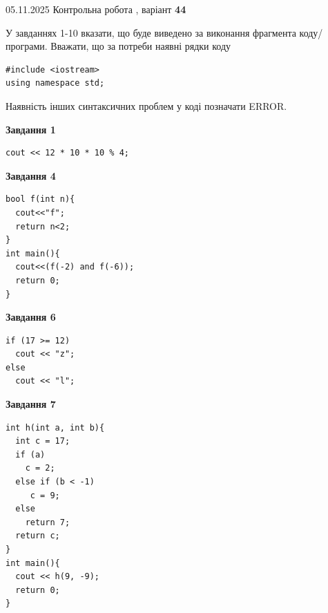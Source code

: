 \documentclass[12pt, ukrainian]{article}
\begin{document}
\newpage

{\Large{05.11.2025 Контрольна робота , варіант  \No \textbf { 44 }\par}}
{
\begin {large}
У завданнях 1-10 вказати, що буде виведено за виконання фрагмента коду/про\-гра\-ми.
Вважати, що за потреби наявні рядки коду
\begin{verbatim}
#include <iostream>
using namespace std;
\end{verbatim}
Наявність інших синтаксичних проблем у коді позначати ERROR.

\begin{minipage}[t]{7.0cm}

\begin{center}
\textbf{Завдання 1}
\end{center}
\vspace{-8mm}

\begin{verbatim}
cout << 12 * 10 * 10 % 4;
\end{verbatim}



\begin{center}
\textbf{Завдання 4}
\end{center}
\vspace{-8mm}

\begin{verbatim}
bool f(int n){
  cout<<"f";
  return n<2;
}
int main(){
  cout<<(f(-2) and f(-6));
  return 0;
}
\end{verbatim}



\begin{center}
\textbf{Завдання 6}
\end{center}
\vspace{-8mm}

\begin{verbatim}
if (17 >= 12)
  cout << "z";
else
  cout << "l";
\end{verbatim}



\begin{center}
\textbf{Завдання 7}
\end{center}
\vspace{-8mm}

\begin{verbatim}
int h(int a, int b){
  int c = 17;
  if (a)
    c = 2;
  else if (b < -1)
     c = 9;
  else
    return 7;
  return c;
}
int main(){
  cout << h(9, -9);
  return 0;
}
\end{verbatim}


\end{minipage}
\end{large}}
\end{document}
